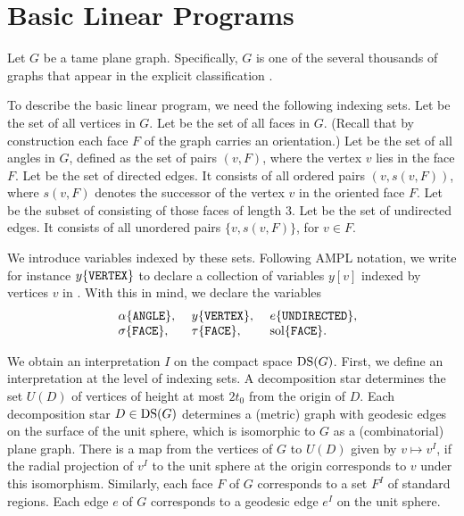 
\section{Basic Linear Programs}
\label{sec:blp}

Let $G$ be a tame plane graph.  Specifically, $G$ is one of the
several thousands of graphs that appear in the explicit
classification \cite{web}.

To describe the basic linear program, we need the following
indexing sets.  Let  be the set of all vertices in
$G$. Let  be the set of all faces in $G$.  (Recall
that by construction each face $F$ of the graph carries an
orientation.) Let  be the set of all angles in $G$,
defined as the set of pairs $(v,F)$, where the vertex $v$ lies in
the face $F$. Let  be the set of directed edges.
It consists of all ordered pairs $(v,s(v,F))$, where $s(v,F)$
denotes the successor of the vertex $v$ in the oriented face $F$.
Let  be the subset of  consisting of
those faces of length $3$.  Let  be the set of
undirected edges. It consists of all unordered pairs
$\{v,s(v,F)\}$, for $v\in F$.

We introduce variables indexed by these sets.  Following AMPL notation,
we write for instance
    $y\{\hbox{\tt VERTEX}\}$
to declare a collection of variables $y[v]$ indexed by vertices $v$ in
.  With this in mind, we declare the variables
    $$\begin{array}{lllll}
        &\alpha\{\hbox{\tt ANGLE}\},\
        &y\{\hbox{\tt VERTEX}\},\
        &e\{\hbox{\tt UNDIRECTED}\},\\
        &\sigma\{\hbox{\tt FACE}\},\
        &\tau\{\hbox{\tt FACE}\},\
        &\operatorname{sol}\{\hbox{\tt FACE}\}.
    \end{array}
    $$

We obtain an interpretation $I$ on the compact space ${\operatorname{DS}}(G)$.
First, we define an interpretation at the level of indexing sets.
A decomposition star determines the set $U(D)$ of vertices of
height at most $2t_0$ from the origin of $D$.  Each decomposition
star $D\in {\operatorname{DS}}(G)$ determines a (metric) graph with geodesic
edges on the surface of the unit sphere, which is isomorphic to
$G$ as a (combinatorial) plane graph.  There is a map from the
vertices of $G$ to $U(D)$ given by $v\mapsto v^I$, if the radial
projection of $v^I$ to the unit sphere at the origin corresponds
to $v$ under this isomorphism. Similarly, each face $F$ of $G$
corresponds to a set $F^I$ of standard regions.   Each edge $e$ of
$G$ corresponds to a geodesic edge $e^I$ on the unit sphere.

